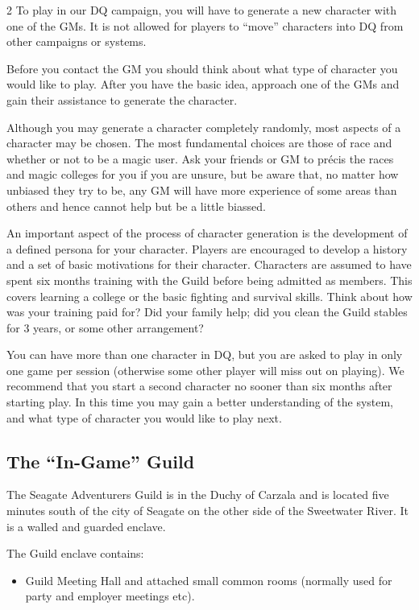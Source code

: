 \begin{multicols}{2}
To play in our DQ campaign, you will have to generate a new character
with one of the GMs. It is not allowed for players to “move”
characters into DQ from other campaigns or systems.

Before you contact the GM you should think about what type of
character you would like to play. After you have the basic idea,
approach one of the GMs and gain their assistance to generate the
character.

Although you may generate a character completely randomly, most
aspects of a character may be chosen. The most fundamental choices are
those of race and whether or not to be a magic user. Ask your friends
or GM to précis the races and magic colleges for you if you are
unsure, but be aware that, no matter how unbiased they try to be, any
GM will have more experience of some areas than others and hence
cannot help but be a little biassed.

An important aspect of the process of character generation is the
development of a defined persona for your character. Players are
encouraged to develop a history and a set of basic motivations for
their character.  Characters are assumed to have spent six months
training with the Guild before being admitted as members. This covers
learning a college or the basic fighting and survival skills.  Think
about how was your training paid for?  Did your family help; did you
clean the Guild stables for 3 years, or some other arrangement?

You can have more than one character in DQ, but you are asked to play
in only one game per session (otherwise some other player will miss
out on playing). We recommend that you start a second character no
sooner than six months after starting play. In this time you may gain
a better understanding of the system, and what type of character you
would like to play next.

\subsection{The “In-Game” Guild}

The Seagate Adventurers Guild is in the Duchy of Carzala and is
located five minutes south of the city of Seagate on the other side of
the Sweetwater River. It is a walled and guarded enclave.

The Guild enclave contains:
\begin{itemize}
\item Guild Meeting Hall and attached small common rooms (normally
  used for party and employer meetings etc).


\end{itemize}
\end{multicols}
